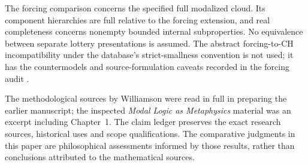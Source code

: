 \documentclass[12pt,letterpaper]{article}
\begin{document}
The forcing comparison concerns the specified full modalized cloud. Its component hierarchies are full relative to the forcing extension, and real completeness concerns nonempty bounded internal subproperties. No equivalence between separate lottery presentations is assumed. The abstract forcing-to-CH incompatibility under the database's strict-smallness convention is not used; it has the countermodels and source-formulation caveats recorded in the forcing audit \citep{forcingaudit}.

The methodological sources by Williamson were read in full in preparing the earlier manuscript; the inspected \emph{Modal Logic as Metaphysics} material was an excerpt including Chapter~1. The claim ledger preserves the exact research sources, historical uses and scope qualifications. The comparative judgments in this paper are philosophical assessments informed by those results, rather than conclusions attributed to the mathematical sources.
\end{document}
